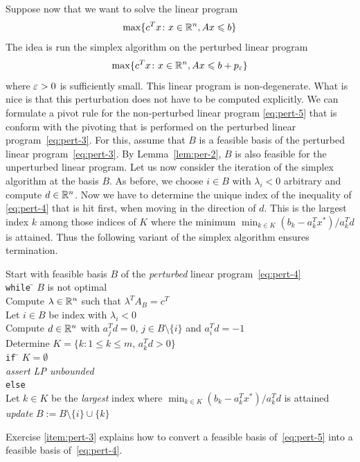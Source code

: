 Suppose now that we want to solve the linear program
\begin{equation}
  \label{eq:pert-5}
  \max\{c^Tx \colon x \in \mathbb{R}^n, Ax \leqslant b \}
\end{equation}
The idea is run the simplex algorithm  on the perturbed linear program 
\begin{equation}
  \label{eq:pert-4}
  \max\{c^Tx \colon x \in \mathbb{R}^n, Ax \leqslant b+p_{\varepsilon} \}
\end{equation}
where ${\varepsilon}>0$ is sufficiently small. This linear program is
non-degenerate. What is nice is that this perturbation does not have
to be computed explicitly. We can formulate a pivot rule for the
non-perturbed linear program \eqref{eq:pert-5} that is conform with the pivoting that is
performed on the perturbed linear program~\eqref{eq:pert-3}. For this, assume that $B$ is a feasible basis of the perturbed linear program~\eqref{eq:pert-3}. By  Lemma~\ref{lem:per-2}, $B$ is also feasible for the unperturbed linear program. Let us now consider the iteration of the simplex algorithm at the basis $B$. As before, we choose $i \in B$ with $\lambda_i<0$ arbitrary and compute $d \in \mathbb{R}^n$. Now we have to determine the unique index of the inequality of \eqref{eq:pert-4} that is hit first, when moving in the direction of $d$. This is the largest index $k$ among those indices of $K$ where the minimum $\min_{k \in K} (b_k - a_k^Tx^*)/a_k^Td$ is attained. Thus the following variant of the simplex algorithm ensures termination. 


\begin{algorithm}
  \label{alg:pert-1}
 \begin{tabbing}
      Start with feasible basis $B$ of the \emph{perturbed} linear program~\eqref{eq:pert-4} \\[1ex]
      {\tt while} \= $B$ is not optimal \\ [.7ex]
      \> Compute $\lambda \in \mathbb{R}^n$ such that $\lambda^TA_B = c^T$ \\
      \> Let $i \in B$ be index with $\lambda_i<0$ \\
      \> Compute  $d \in \mathbb{R}^n$ with $a_j^T d = 0, \, j \in B \setminus\{i\}$
      and $a_i^T d = -1$ \\ 
      \> Determine $K = \{ k \colon 1 \leq k \leq m, \, a_k^Td >0\}$\\[.7ex]  
      \> {\tt if} \= $K = \emptyset$ \\   
      \> \> \emph{assert LP unbounded} \\
      \> {\tt else} \\
      \> \> Let $k \in K$ be the \emph{largest} index where 
     $
        \displaystyle \min_{k \in K} (b_k - a_k^Tx^*)/a_k^Td
      $
      is attained \\

      \> \>\emph{update} $B := B \setminus\{i\} \cup \{k\}$             
    \end{tabbing}
    
  \end{algorithm}
%
Exercise \ref{item:pert-3} explains how to convert a feasible basis of~\eqref{eq:pert-5} into a feasible basis of~\eqref{eq:pert-4}. 

